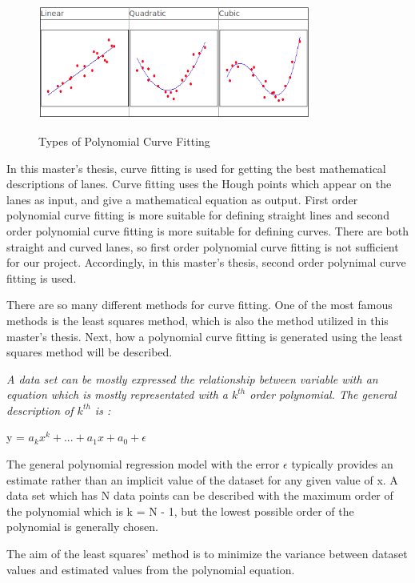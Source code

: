 \begin{figure}[H]
 \centering
  \includegraphics[width=0.8\textwidth]{./Bilder/Curve_Fitting_Polynomial.png}\label{Curve_Fitting_Polynomial}
  \caption{Types of Polynomial Curve Fitting\cite{Curve_Fitting_Polynomial}}
\end{figure}


In this master's thesis, curve fitting is used for getting the best mathematical descriptions of lanes. Curve fitting uses the Hough points which appear on the lanes as input, and give a mathematical equation as output. First order polynomial curve fitting is more suitable for defining straight lines and second order polynomial curve fitting is more suitable for defining curves. There are both straight and curved lanes, so first order polynomial curve fitting is not sufficient for our project. Accordingly, in this master's thesis, second order polynimal curve fitting is used.

There are so many different methods for curve fitting. One of the most famous methods is the least squares method, which is also the method utilized in this master's thesis. Next, how a polynomial curve fitting is generated using the least squares method will be described.

\emph{\color{blue}A data set can be mostly expressed the relationship between variable with an equation which is mostly representated with a $k^{th}$ order polynomial. The general description of $ k^{th} $ is :}

\begin{center}
y = $ a_{k}x^{k} + ... + a_{1}x + a_{0} + \epsilon $ 
\end{center}

The general polynomial regression model with the error $\epsilon$ typically provides an estimate rather than an implicit value of the dataset for any given value of x. A data set which has N data points can be described with the maximum order of the polynomial which is k = N - 1, but the lowest possible order of the polynomial is generally chosen.

The aim of the least squares' method is to minimize the variance between dataset values and estimated values from the polynomial equation.

